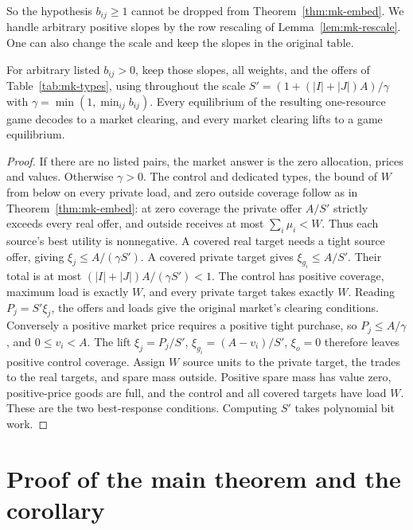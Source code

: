 So the hypothesis $b_{ij}\ge1$ cannot be dropped from Theorem~\ref{thm:mk-embed}. We handle arbitrary
positive slopes by the row rescaling of Lemma~\ref{lem:mk-rescale}. One
can also change the scale and keep the slopes in the original table.

\begin{corollary}\label{cor:mk-original-slopes}
For arbitrary listed $b_{ij}>0$, keep those slopes, all weights, and the
offers of Table~\ref{tab:mk-types}, using throughout the scale
$S'=(1+(|I|+|J|)A)/\gamma$ with $\gamma=\min(1,\min_{ij}b_{ij})$.
Every equilibrium of the resulting one-resource game decodes to a
market clearing, and every market clearing lifts to a game equilibrium.
\end{corollary}
\par
\begin{proof}
If there are no listed pairs, the market answer is the zero allocation,
prices and values. Otherwise $\gamma>0$. The control and dedicated types,
the bound of $W$ from below on every private load, and zero outside coverage
follow as in Theorem~\ref{thm:mk-embed}: at zero coverage the private
offer $A/S'$ strictly exceeds every real offer, and outside receives
at most $\sum_i\mu_i<W$. Thus each source's best utility is nonnegative.
A covered real target needs a tight source offer, giving
$\xi_j\le A/(\gamma S')$. A covered private target gives
$\xi_{g_i}\le A/S'$. Their total is at most
$(|I|+|J|)A/(\gamma S')<1$. The control has positive coverage, maximum
load is exactly $W$, and every private target takes exactly $W$.
Reading $P_j=S'\xi_j$, the offers and loads give the original market's
clearing conditions. Conversely a positive market price requires a
positive tight purchase, so $P_j\le A/\gamma$, and $0\le v_i<A$.
The lift $\xi_j=P_j/S'$, $\xi_{g_i}=(A-v_i)/S'$, $\xi_o=0$ therefore
leaves positive control coverage. Assign $W$ source units to the private
target, the trades to the real targets, and spare mass outside.
Positive spare mass has value zero, positive-price goods are full, and
the control and all covered targets have load $W$. These are the two
best-response conditions. Computing $S'$ takes polynomial bit work.
\end{proof}

\section{Proof of the main theorem and the corollary}\label{sec:mk-proof}

